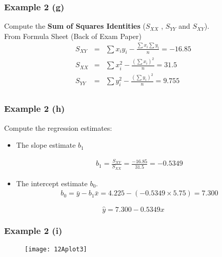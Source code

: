 \documentclass[a4]{beamer}
\begin{document}
\begin{frame}
\frametitle{Example 2 (g)}
Compute the \textbf{Sum of Squares Identities} ($S_{XX}$ , $S_{YY}$ and $S_{XY}$).\\
\bigskip
From Formula Sheet (Back of Exam Paper)
\begin{eqnarray*}
S_{XY} &=&
\sum x_iy_i - \frac{\sum x_i\sum y_i}{n} = -16.85\\
S_{XX} &=&
\sum x_i^2 - \frac{(\sum x_i)^2}{n} = 31.5\\
S_{YY} &=&
\sum y_i^2 - \frac{(\sum y_i)^2}{n} = 9.755\\
\end{eqnarray*}
\end{frame}

\begin{frame}
\frametitle{Example 2 (h)}
Compute the regression estimates:
\begin{itemize}
\item  The slope estimate $b_1$

\begin{eqnarray*}
b_1 = \frac{S_{XY}}{S_{XX}} = \frac{-16.85}{31.5} = -0.5349
\end{eqnarray*}

\item  The intercept estimate $b_0$.
\begin{eqnarray*}
 b_0 = \bar{y} -b_1\bar{x} = 4.225 - (-0.5349 \times 5.75) = 7.300
\end{eqnarray*}
\end{itemize}

\[ \hat{y}  = 7.300 -0.5349 x \]

\end{frame}

\begin{frame}
\frametitle{Example 2 (i)}

\begin{figure}
  \texttt{[image: 12Aplot3]}\\
\end{figure}

\end{frame}
\end{document}
